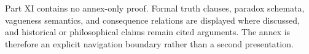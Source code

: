 \label{annex:p11}

Part XI contains no annex-only proof. Formal truth clauses, paradox schemata,
vagueness semantics, and consequence relations are displayed where discussed,
and historical or philosophical claims remain cited arguments. The annex is
therefore an explicit navigation boundary rather than a second presentation.
